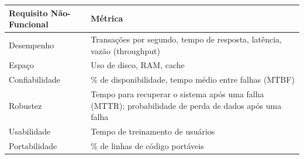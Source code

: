 \documentclass[
  11pt,
  twoside]{book}
\begin{document}
\begin{longtable}[]{@{}ll@{}}
\toprule
\begin{minipage}[b]{0.47\columnwidth}\raggedright
\textbf{Requisito Não-Funcional}\strut
\end{minipage} & \begin{minipage}[b]{0.47\columnwidth}\raggedright
\textbf{Métrica}\strut
\end{minipage}\tabularnewline
\midrule
\endhead
\begin{minipage}[t]{0.47\columnwidth}\raggedright
Desempenho\strut
\end{minipage} & \begin{minipage}[t]{0.47\columnwidth}\raggedright
Transações por segundo, tempo de resposta, latência, vazão
(throughput)\strut
\end{minipage}\tabularnewline
\begin{minipage}[t]{0.47\columnwidth}\raggedright
Espaço\strut
\end{minipage} & \begin{minipage}[t]{0.47\columnwidth}\raggedright
Uso de disco, RAM, cache\strut
\end{minipage}\tabularnewline
\begin{minipage}[t]{0.47\columnwidth}\raggedright
Confiabilidade\strut
\end{minipage} & \begin{minipage}[t]{0.47\columnwidth}\raggedright
\% de disponibilidade, tempo médio entre falhas (MTBF)\strut
\end{minipage}\tabularnewline
\begin{minipage}[t]{0.47\columnwidth}\raggedright
Robustez\strut
\end{minipage} & \begin{minipage}[t]{0.47\columnwidth}\raggedright
Tempo para recuperar o sistema após uma falha (MTTR); probabilidade de
perda de dados após uma falha\strut
\end{minipage}\tabularnewline
\begin{minipage}[t]{0.47\columnwidth}\raggedright
Usabilidade\strut
\end{minipage} & \begin{minipage}[t]{0.47\columnwidth}\raggedright
Tempo de treinamento de usuários\strut
\end{minipage}\tabularnewline
\begin{minipage}[t]{0.47\columnwidth}\raggedright
Portabilidade\strut
\end{minipage} & \begin{minipage}[t]{0.47\columnwidth}\raggedright
\% de linhas de código portáveis\strut
\end{minipage}\tabularnewline
\bottomrule
\end{longtable}
\end{document}
